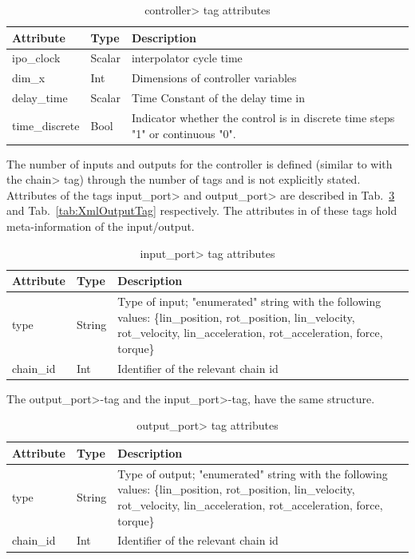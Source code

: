 \begin{table}
  \centering
  \caption{\<controller> tag attributes}
  \label{tab:XmlController}
  \begin{tabular}{p{}p{}p{}}
    \hline\hline
    Attribute & Type & Description \\
    \hline
    ipo\_clock & Scalar & interpolator cycle time \[s]\\
    dim\_x & Int & Dimensions of controller variables\\
    delay\_time & Scalar & Time Constant of the delay time in \[s]\\
    time\_discrete & Bool & Indicator whether the control is in discrete time steps "1" or continuous "0".\\
    \hline\hline
  \end{tabular}
\end{table}

The number of inputs and outputs for the controller is defined (similar to with
the \<chain> tag) through the number of tags and is not explicitly stated.
Attributes of the tags  \<input\_port> and \<output\_port> are described in
Tab.~\ref{tab:XmlInputTag} and Tab.~\ref{tab:XmlOutputTag} respectively. The
attributes in of these tags hold meta-information of the input/output.

\begin{table}
  \centering
  \caption{\<input\_port> tag attributes}
  \label{tab:XmlInputTag}
  \begin{tabular}{p{}p{}p{}}
    \hline\hline
    Attribute & Type & Description \\
    \hline
    type & String & Type of input; "enumerated" string with the following values:
    \{lin\_position, rot\_position, lin\_velocity, rot\_velocity, lin\_acceleration, rot\_acceleration, force, torque\}\\
    chain\_id & Int & Identifier of the relevant chain id\\
    \hline\hline
  \end{tabular}
\end{table}


The \<output\_port>-tag and the \<input\_port>-tag, have the same structure.

\begin{table}
  \centering
  \caption{\<output\_port> tag attributes}
  \label{tab:XmlInputTag}
  \begin{tabular}{p{}p{}p{}}
    \hline\hline
    Attribute & Type & Description \\
    \hline
    type & String & Type of output; "enumerated" string with the following values:
    \{lin\_position, rot\_position, lin\_velocity, rot\_velocity, lin\_acceleration, rot\_acceleration, force, torque\}\\
    chain\_id & Int & Identifier of the relevant chain id\\
    \hline\hline
  \end{tabular}
\end{table}

